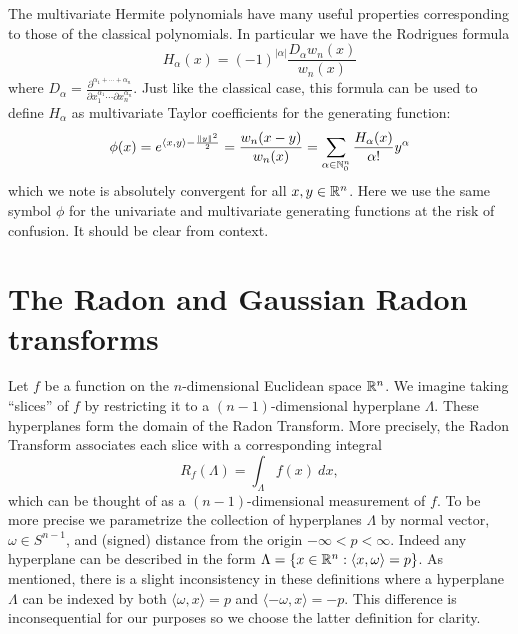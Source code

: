 The multivariate Hermite polynomials have many useful properties corresponding to those of the classical polynomials. In particular we have the Rodrigues formula
\[
  H_\alpha(x) 
    = (-1)^{|\alpha|}\frac{D_{\alpha}w_n(x)}{w_n(x)}
\]
where $D_\alpha = \frac{\partial^{\alpha_1 + \cdots + \alpha_n}}{\partial x_1^{\alpha_1} \cdots \partial x_n^{\alpha_n}}$. Just like the classical case, this formula can be used to define $H_\alpha$ as multivariate Taylor coefficients for the generating function:
\[
  \phi(x) = e^{\langle x, y\rangle - \frac{\|y\|^2}2} 
    = \frac{w_n(x - y)}{w_n(x)} 
      = \sum_{\alpha \in \mathbb{N}_0^n} \frac{H_\alpha(x)}{\alpha!}y^\alpha
\]
which we note is absolutely convergent for all $x, y \in \mathbb{R}^n$. Here we use the same symbol $\phi$ for the univariate and multivariate generating functions at the risk of confusion. It should be clear from context.




\section{The Radon and Gaussian Radon transforms}

Let $f$ be a function on the $n$-dimensional Euclidean space $\mathbb{R}^n$. We imagine taking ``slices'' of $f$ by restricting it to a $(n-1)$-dimensional hyperplane $\Lambda$. These hyperplanes form the domain of the Radon Transform. More precisely, the Radon Transform associates each slice with a corresponding integral
\[
  R_f(\Lambda) = \int_{\Lambda} f(x) ~dx,
\]
which can be thought of as a $(n-1)$-dimensional measurement of $f$. To be more precise we parametrize the collection of hyperplanes $\Lambda$ by normal vector, $\omega \in S^{n-1}$, and (signed) distance from the origin $-\infty < p < \infty$. Indeed any hyperplane can be described in the form $\Lambda = \{x \in \mathbb{R}^n: \langle x, \omega\rangle = p\}$. As mentioned, there is a slight inconsistency in these definitions where a hyperplane $\Lambda$ can be indexed by both $\langle \omega, x \rangle = p$ and $\langle -\omega, x \rangle = -p$. This difference is inconsequential for our purposes so we choose the latter definition for clarity.

